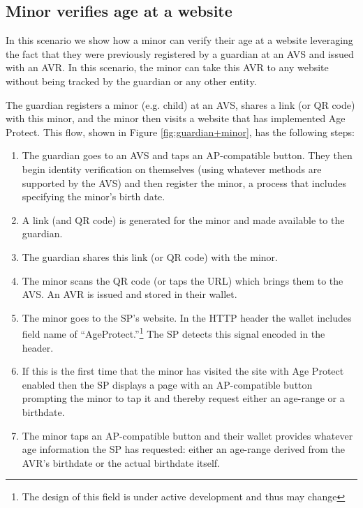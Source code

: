 \documentclass[11pt, oneside]{article}   	%
\begin{document}
\subsection{Minor verifies age at a website}

In this scenario we show how a minor can verify their age at a website leveraging the fact that they were previously registered by a guardian at an AVS and issued with an AVR. In this scenario, the minor can take this AVR to any website without being tracked by the guardian or any other entity. 

The guardian registers a minor (e.g. child) at an AVS, shares a link (or QR code) with this minor, and the minor then visits a website that has implemented Age Protect. This flow, shown in Figure \ref{fig:guardian+minor}, has the following steps:
\begin{enumerate}
	\item The guardian goes to an AVS and taps an AP-compatible button. They then begin identity verification on themselves (using whatever methods are supported by the AVS) and then register the minor, a process that includes specifying the minor's birth date.
	\item A link (and QR code) is generated for the minor and made available to the guardian.
	\item The guardian shares this link (or QR code) with the minor.
	\item The minor scans the QR code (or taps the URL) which brings them to the AVS. An AVR is issued and stored in their wallet.
	\item The minor goes to the SP's website. In the HTTP header the wallet includes field name of ``AgeProtect.''\footnote{The design of this field is under active development and thus may change} The SP detects this signal encoded in the header.
	\item If this is the first time that the minor has visited the site with Age Protect enabled then the SP displays a page with an AP-compatible button prompting the minor to tap it and thereby request either an age-range or a birthdate.
	\item The minor taps an AP-compatible button and their wallet provides whatever age information the SP has requested: either an age-range derived from the AVR's birthdate or the actual birthdate itself.
\end{enumerate}
\end{document}
